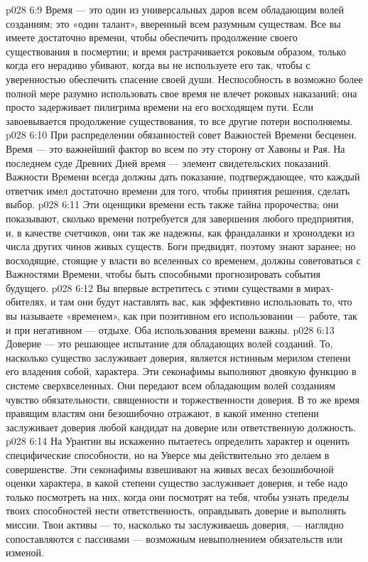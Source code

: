 \vs p028 6:9 \bibnobreakspace {} Время --- это один из универсальных даров всем обладающим волей созданиям; это «один талант», вверенный всем разумным существам. Все вы имеете достаточно времени, чтобы обеспечить продолжение своего существования в посмертии; и время растрачивается роковым образом, только когда его нерадиво убивают, когда вы не используете его так, чтобы с уверенностью обеспечить спасение своей души. Неспособность в возможно более полной мере разумно использовать свое время не влечет роковых наказаний; она просто задерживает пилигрима времени на его восходящем пути. Если завоевывается продолжение существования, то все другие потери восполняемы.
\vs p028 6:10 При распределении обязанностей совет Важностей Времени бесценен. Время --- это важнейший фактор во всем по эту сторону от Хавоны и Рая. На последнем суде Древних Дней время --- элемент свидетельских показаний. Важности Времени всегда должны дать показание, подтверждающее, что каждый ответчик имел достаточно времени для того, чтобы принятия решения, сделать выбор.
\vs p028 6:11 Эти оценщики времени есть также тайна пророчества; они показывают, сколько времени потребуется для завершения любого предприятия, и, в качестве счетчиков, они так же надежны, как франдаланки и хронолдеки из числа других чинов живых существ. Боги предвидят, поэтому знают заранее; но восходящие, стоящие у власти во вселенных со временем, должны советоваться с Важностями Времени, чтобы быть способными прогнозировать события будущего.
\vs p028 6:12 Вы впервые встретитесь с этими существами в мирах\hyp{}обителях, и там они будут наставлять вас, как эффективно использовать то, что вы называете «временем», как при позитивном его использовании --- работе, так и при негативном --- отдыхе. Оба использования времени важны.
\vs p028 6:13 \bibnobreakspace {} Доверие --- это решающее испытание для обладающих волей созданий. То, насколько существо заслуживает доверия, является истинным мерилом степени его владения собой, характера. Эти секонафимы выполняют двоякую функцию в системе сверхвселенных. Они передают всем обладающим волей созданиям чувство обязательности, священности и торжественности доверия. В то же время правящим властям они безошибочно отражают, в какой именно степени заслуживает доверия любой кандидат на доверие или ответственную должность.
\vs p028 6:14 На Урантии вы искаженно пытаетесь определить характер и оценить специфические способности, но на Уверсе мы действительно это делаем в совершенстве. Эти секонафимы взвешивают на живых весах безошибочной оценки характера, в какой степени существо заслуживает доверия, и тебе надо только посмотреть на них, когда они посмотрят на тебя, чтобы узнать пределы твоих способностей нести ответственность, оправдывать доверие и выполнять миссии. Твои активы --- то, насколько ты заслуживаешь доверия, --- наглядно сопоставляются с пассивами --- возможным невыполнением обязательств или изменой.

